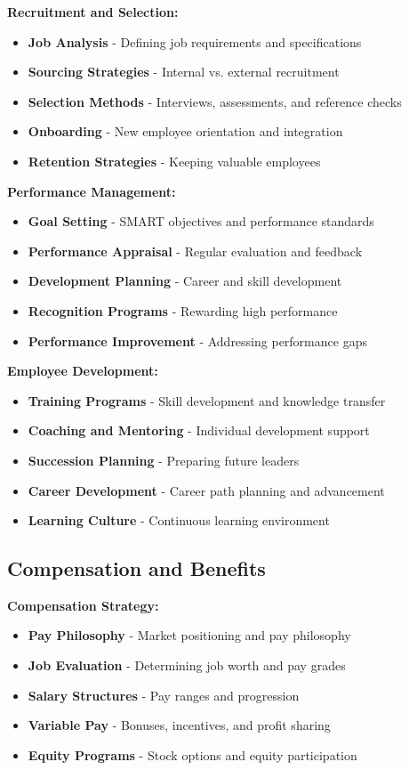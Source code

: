 \documentclass[12pt]{article}
\begin{document}
\textbf{Recruitment and Selection:}
\begin{itemize}
    \item \textbf{Job Analysis} - Defining job requirements and specifications
    \item \textbf{Sourcing Strategies} - Internal vs. external recruitment
    \item \textbf{Selection Methods} - Interviews, assessments, and reference checks
    \item \textbf{Onboarding} - New employee orientation and integration
    \item \textbf{Retention Strategies} - Keeping valuable employees
\end{itemize}

\textbf{Performance Management:}
\begin{itemize}
    \item \textbf{Goal Setting} - SMART objectives and performance standards
    \item \textbf{Performance Appraisal} - Regular evaluation and feedback
    \item \textbf{Development Planning} - Career and skill development
    \item \textbf{Recognition Programs} - Rewarding high performance
    \item \textbf{Performance Improvement} - Addressing performance gaps
\end{itemize}

\textbf{Employee Development:}
\begin{itemize}
    \item \textbf{Training Programs} - Skill development and knowledge transfer
    \item \textbf{Coaching and Mentoring} - Individual development support
    \item \textbf{Succession Planning} - Preparing future leaders
    \item \textbf{Career Development} - Career path planning and advancement
    \item \textbf{Learning Culture} - Continuous learning environment
\end{itemize}

\subsection{Compensation and Benefits}

\textbf{Compensation Strategy:}
\begin{itemize}
    \item \textbf{Pay Philosophy} - Market positioning and pay philosophy
    \item \textbf{Job Evaluation} - Determining job worth and pay grades
    \item \textbf{Salary Structures} - Pay ranges and progression
    \item \textbf{Variable Pay} - Bonuses, incentives, and profit sharing
    \item \textbf{Equity Programs} - Stock options and equity participation
\end{itemize}
\end{document}
